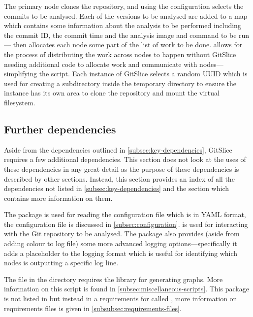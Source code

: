 \documentclass[11pt]{article}
\begin{document}
    The primary node clones the repository, and using the configuration selects the commits to be analysed.
    Each of the versions to be analysed are added to a map which contains some information about the analysis to be performed including the commit ID, the commit time and the analysis image and command to be run--- then allocates each node some part of the list of work to be done.
     allows for the process of distributing the work across nodes to happen without GitSlice needing additional code to allocate work and communicate with nodes---simplifying the script.
    Each instance of GitSlice selects a random UUID which is used for creating a subdirectory inside the temporary directory to ensure the instance has its own area to clone the repository and mount the virtual filesystem.

    \subsection{Further dependencies}
    \label{subsec:further-dependencies}
    
    Aside from the dependencies outlined in \autoref{subsec:key-dependencies}, GitSlice requires a few additional dependencies.
    This section does not look at the uses of these dependencies in any great detail as the purpose of these dependencies is described by other sections.
    Instead, this section provides an index of all the dependencies not listed in \autoref{subsec:key-dependencies} and the section which contains more information on them.

    The  package is used for reading the configuration file which is in YAML format, the configuration file is discussed in \autoref{subsec:configuration}.
     is used for interacting with the Git repository to be analysed.
    The  package also provides (aside from adding colour to log file) some more advanced logging options---specifically it adds a  placeholder to the logging format which is useful for identifying which nodes is outputting a specific log line.

    The  file in the  directory requires the  library for generating graphs.
    More information on this script is found in \autoref{subsec:miscellaneous-scripts}.
    This package is not listed in  but instead in a requirements for  called , more information on requirements files is given in \autoref{subsubsec:requirements-files}.
\end{document}
